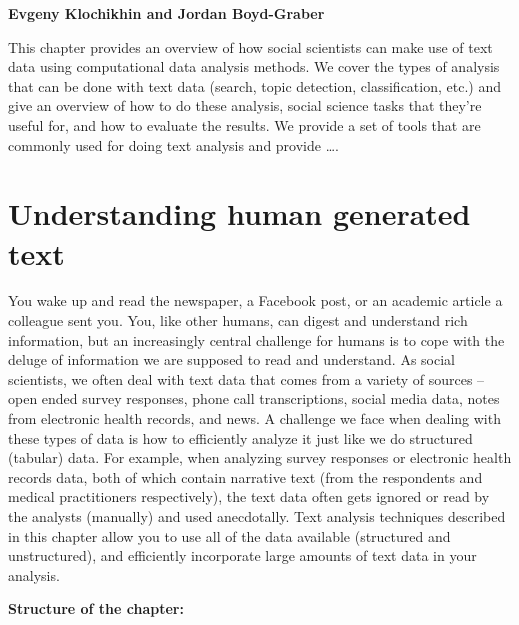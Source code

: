 \documentclass[]{krantz}
\begin{document}
\textbf{Evgeny Klochikhin and Jordan Boyd-Graber}

This chapter provides an overview of how social scientists can make use
of text data using computational data analysis methods. We cover the
types of analysis that can be done with text data (search, topic
detection, classification, etc.) and give an overview of how to do these
analysis, social science tasks that they're useful for, and how to
evaluate the results. We provide a set of tools that are commonly used
for doing text analysis and provide \ldots{}.

\section{Understanding human generated
text}\label{understanding-human-generated-text}

You wake up and read the newspaper, a Facebook post, or an academic
article a colleague sent you. You, like other humans, can digest and
understand rich information, but an increasingly central challenge for
humans is to cope with the deluge of information we are supposed to read
and understand. As social scientists, we often deal with text data that
comes from a variety of sources -- open ended survey responses, phone
call transcriptions, social media data, notes from electronic health
records, and news. A challenge we face when dealing with these types of
data is how to efficiently analyze it just like we do structured
(tabular) data. For example, when analyzing survey responses or
electronic health records data, both of which contain narrative text
(from the respondents and medical practitioners respectively), the text
data often gets ignored or read by the analysts (manually) and used
anecdotally. Text analysis techniques described in this chapter allow
you to use all of the data available (structured and unstructured), and
efficiently incorporate large amounts of text data in your analysis.

\textbf{Structure of the chapter:}
\end{document}
